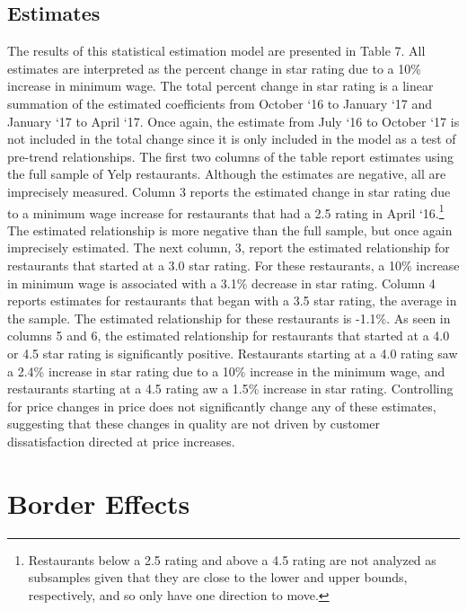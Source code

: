 \documentclass[11pt]{article}
\begin{document}
\subsection{Estimates}
The results of this statistical estimation model are presented in Table 7. All estimates are interpreted as the percent change in star rating due to a 10\% increase in minimum wage. The total percent change in star rating is a linear summation of the estimated coefficients from October `16 to January `17 and January `17 to April `17. Once again, the estimate from July `16 to October `17 is not included in the total change since it is only included in the model as a test of pre-trend relationships. The first two columns of the table report estimates using the full sample of Yelp restaurants. Although the estimates are negative, all are imprecisely measured. Column 3 reports the estimated change in star rating due to a minimum wage increase for restaurants that had a 2.5 rating in April `16.\footnote{Restaurants below a 2.5 rating and above a 4.5 rating are not analyzed as subsamples given that they are close to the lower and upper bounds, respectively, and so only have one direction to move.} The estimated relationship is more negative than the full sample, but once again imprecisely estimated. The next column, 3, report the estimated relationship for restaurants that started at a 3.0 star rating. For these restaurants, a 10\% increase in minimum wage is associated with a 3.1\% decrease in star rating. Column 4 reports estimates for restaurants that began with a 3.5 star rating, the average in the sample. The estimated relationship for these restaurants is -1.1\%. As seen in columns 5 and 6, the estimated relationship for restaurants that started at a 4.0 or 4.5 star rating is significantly positive. Restaurants starting at a 4.0 rating saw a 2.4\% increase in star rating due to a 10\% increase in the minimum wage, and restaurants starting at a 4.5 rating aw a 1.5\% increase in star rating. Controlling for price changes in price does not significantly change any of these estimates, suggesting that these changes in quality are not driven by customer dissatisfaction directed at price increases. 





\section{Border Effects}
\end{document}
